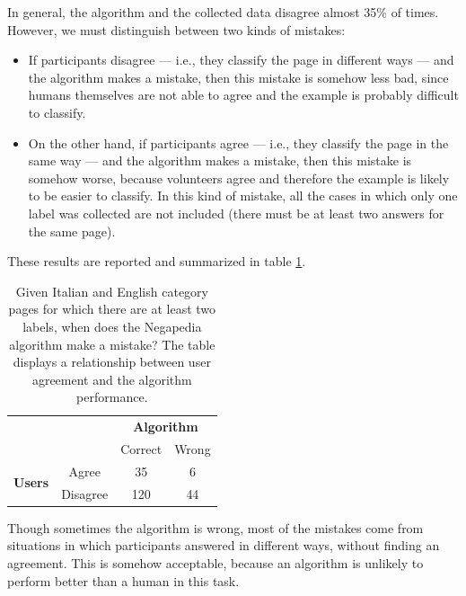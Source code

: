             In general, the algorithm and the collected data disagree almost 35\% of times. However, we must distinguish between two kinds of mistakes:
            \begin{itemize}
                \item If participants disagree --- i.e., they classify the page in different ways --- and the algorithm makes a mistake, then this mistake is somehow less bad, since humans themselves are not able to agree and the example is probably difficult to classify.
                \item On the other hand, if participants agree --- i.e., they classify the page in the same way --- and the algorithm makes a mistake, then this mistake is somehow worse, because volunteers agree and therefore the example is likely to be easier to classify. In this kind of mistake, all the cases in which only one label was collected are not included (there must be at least two answers for the same page).
            \end{itemize}
            These results are reported and summarized in table \ref{negapedia_errors}.
            
            \begin{table}[]
                \centering
                \begin{tabular}{cc|c|c|}
                    \cline{3-4}
                    & & \multicolumn{2}{c|}{\textbf{Algorithm}} \\ \cline{3-4} 
                    & & Correct & Wrong \\ \hline
                    \multicolumn{1}{|c|}{\multirow{2}{*}{\textbf{Users}}} & Agree & 35 & 6 \\ \cline{2-4} 
                    \multicolumn{1}{|c|}{} & Disagree & 120 & 44 \\ \hline
                \end{tabular}
                \caption{Given Italian and English category pages for which there are at least two labels, when does the Negapedia algorithm make a mistake? The table displays a relationship between user agreement and the algorithm performance.}
                \label{negapedia_errors}
            \end{table}
            
            Though sometimes the algorithm is wrong, most of the mistakes come from situations in which participants answered in different ways, without finding an agreement. This is somehow acceptable, because an algorithm is unlikely to perform better than a human in this task.
            
